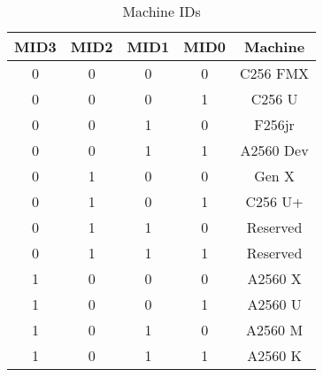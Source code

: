 \begin{table}[h]
    \begin{center}
        \begin{tabular}{|c|c|c|c|c|} \hline
            MID3 & MID2 & MID1 & MID0 & Machine \\\hline\hline
            0 & 0 & 0 & 0 & C256 FMX \\ \hline
            0 & 0 & 0 & 1 & C256 U \\ \hline
            0 & 0 & 1 & 0 & F256jr \\ \hline
            0 & 0 & 1 & 1 & A2560 Dev \\ \hline
            0 & 1 & 0 & 0 & Gen X \\ \hline
            0 & 1 & 0 & 1 & C256 U+ \\ \hline
            0 & 1 & 1 & 0 & Reserved \\ \hline
            0 & 1 & 1 & 1 & Reserved \\ \hline
            1 & 0 & 0 & 0 & A2560 X \\ \hline
            1 & 0 & 0 & 1 & A2560 U \\ \hline
            1 & 0 & 1 & 0 & A2560 M \\ \hline
            1 & 0 & 1 & 1 & A2560 K \\ \hline
        \end{tabular}
    \end{center}
    \caption{Machine IDs}
    \label{tab:machine_ids}
\end{table}
